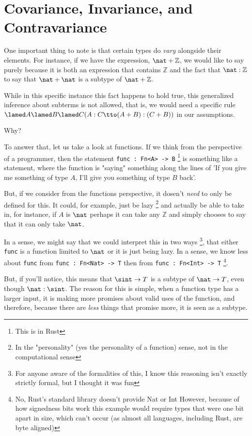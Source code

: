 \section{Covariance, Invariance, and Contravariance}

One important thing to note is that certain types do \emph{vary} alongside their elements.
For instance, if we have the expression, $\nat + \mathbb{Z}$, we would like to say purely because it is both an expression that contains $\mathbb{Z}$ and the fact that $\nat : \mathbb{Z}$ to say that $\nat + \nat$ is a subtype of $\nat + \mathbb{Z}$.

While in this specific instance this fact happens to hold true, this generalized inference about subterms is not allowed, that is, we would need a specific rule $\lamed A \lamed B \lamed C (A : C \tto (A + B) : (C + B))$ in our assumptions.

Why? 

To answer that, let us take a look at functions.
If we think from the perspective of a programmer, then the statement \verb|func : Fn<A> -> B| \footnote{This is in Rust} is something like a statement, where the function is "saying" something along the lines of 'If you give me something of type $A$, I'll give you something of type $B$ back'.

But, if we consider from the functions perspective, it dosen't \emph{need} to only be defined for this.
It could, for example, just be lazy \footnote{In the "personality" (yes the personality of a function) sense, not in the computational sense} and actually be able to take in, for instance, if $A$ is $\nat$ perhaps it can take any $\mathbb{Z}$ and simply chooses to say that it can only take $\nat$.

In a sense, we might say that we could interpret this in two ways \footnote{For anyone aware of the formalities of this, I know this reasoning isn't exactly strictly formal, but I thought it was fun}, that either \verb|func| is a function limited to $\nat$ or it is just being lazy. 
In a sense, we know less about \verb|func| from \verb|func : Fn<Nat> -> T| then from \verb|func : Fn<Int> -> T| \footnote{No, Rust's standard library doesn't provide Nat or Int However, because of how signedness bits work this example would require types that were one bit apart in size, which can't occur (as almost all languages, including Rust, are byte aligned)}.

But, if you'll notice, this means that $\sint \to T$ is a subtype of $\nat \to T$, even though $\nat : \sint$.
The reason for this is simple, when a function type has a larger input, it is making more promises about valid uses of the function, and therefore, because there are \emph{less} things that promise more, it is seen as a subtype.

